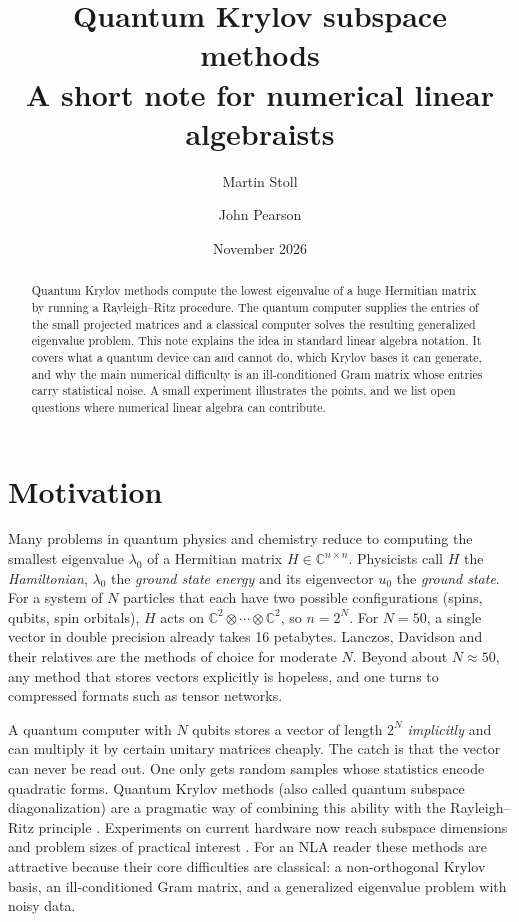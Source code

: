 \documentclass[11pt,a4paper]{article}
\title{Quantum Krylov subspace methods\\[2pt]
\large A short note for numerical linear algebraists}
\author{Martin Stoll \and John Pearson}
\date{November 2026}
\newcommand{\C}{\mathbb{C}}
\begin{document}
\maketitle

\begin{abstract}
Quantum Krylov methods compute the lowest eigenvalue of a huge Hermitian
matrix by running a Rayleigh--Ritz procedure. The quantum computer supplies
the entries of the small projected matrices and a classical computer solves
the resulting generalized eigenvalue problem. This note explains the idea
in standard linear algebra notation. It covers what a quantum device can
and cannot do, which Krylov bases it can generate, and why the main
numerical difficulty is an ill-conditioned Gram matrix whose entries carry
statistical noise. A small experiment illustrates the points, and we list
open questions where numerical linear algebra can contribute.
\end{abstract}

\section{Motivation}

Many problems in quantum physics and chemistry reduce to computing the
smallest eigenvalue $\lambda_0$ of a Hermitian matrix $H \in \C^{n\times n}$.
Physicists call $H$ the \emph{Hamiltonian}, $\lambda_0$ the \emph{ground
state energy} and its eigenvector $u_0$ the \emph{ground state}. For a
system of $N$ particles that each have two possible configurations
(spins, qubits, spin orbitals), $H$ acts on $\C^2\otimes\cdots\otimes\C^2$,
so $n = 2^N$. For
$N=50$, a single vector in double precision already takes 16 petabytes.
Lanczos, Davidson and their relatives are the methods of choice for
moderate $N$. Beyond about $N\approx 50$, any method that stores
vectors explicitly is hopeless, and one turns to compressed formats such
as tensor networks.

A quantum computer with $N$ qubits stores a vector of length $2^N$
\emph{implicitly} and can multiply it by certain unitary matrices
cheaply. The catch is that the vector can never be read out. One only
gets random samples whose statistics encode quadratic forms. Quantum
Krylov methods (also called quantum subspace diagonalization) are
a pragmatic way of combining this ability with the Rayleigh--Ritz
principle \cite{PM19,SHE20,Motta20,Klymko22,CG22,ELN22,Kirby24}. Experiments on current hardware now reach
subspace dimensions and problem sizes of practical interest \cite{Yoshioka25}.
For an NLA reader these methods are attractive because their core
difficulties are classical: a non-orthogonal Krylov basis, an
ill-conditioned Gram matrix, and a generalized eigenvalue problem with
noisy data.
\end{document}
